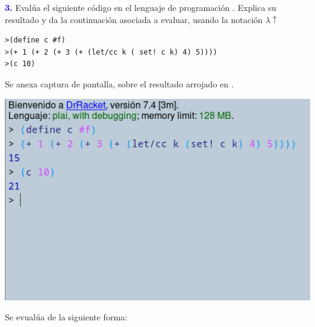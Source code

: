 \Large\textbf{\textcolor{blue}{3.}}
Evalúa el siguiente código en el lenguaje de programación . Explica su resultado
y da la continuación asociada a evaluar, usando la notación $\lambda\uparrow$
\begin{lstlisting}
>(define c #f)
>(+ 1 (+ 2 (+ 3 (+ (let/cc k ( set! c k) 4) 5))))
>(c 10)
\end{lstlisting}

Se anexa captura de pantalla, sobre el resultado arrojado en .
\begin{center}
    \includegraphics[scale=0.5]{Racket.png}
    \end{center}
Se evualúa de la siguiente forma:
